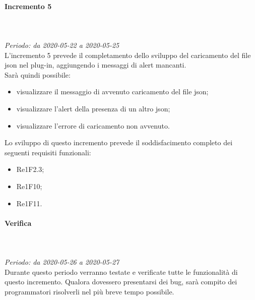 \paragraph{Incremento 5}\mbox{} \\ \mbox{} \\ 
\textit{Periodo: da 2020-05-22 a 2020-05-25}\\
L’incremento 5 prevede il completamento dello sviluppo del caricamento del file json nel plug-in, aggiungendo i messaggi di alert mancanti.\\
Sarà quindi possibile:
\begin{itemize}
	\item visualizzare il messaggio di avvenuto caricamento del file json;
	\item visualizzare l'alert della presenza di un altro json;
	\item visualizzare l'errore di caricamento non avvenuto. 
\end{itemize}
Lo sviluppo di questo incremento prevede il soddisfacimento completo dei seguenti requisiti funzionali:
\begin{itemize}
\item Re1F2.3;
\item Re1F10;
\item Re1F11.
\end{itemize}
\paragraph*{Verifica}\mbox{} \\ \mbox{} \\ 
\textit{Periodo: da 2020-05-26 a 2020-05-27}\\
Durante questo periodo verranno testate e verificate tutte le funzionalità di questo incremento. Qualora dovessero presentarsi dei bug, sarà compito dei programmatori risolverli nel più breve tempo possibile.

